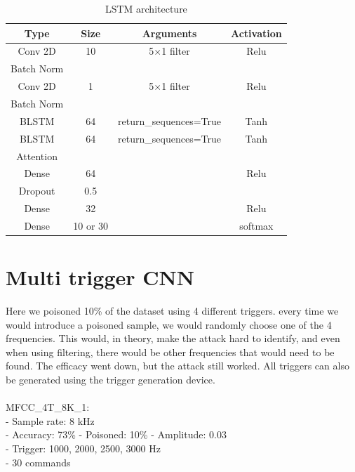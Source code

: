 \documentclass{report}
\theoremstyle{definition}
\theoremstyle{remark}
\begin{document}
\begin{table}[!ht]
    \centering
    \small
        \begin{tabular}{cccc}
            \hline
            Type & Size & Arguments & Activation \\ \hline
            Conv 2D & 10 & 5$\times$1 filter & Relu \\ 
            Batch Norm &  &  &  \\ 
            Conv 2D & 1 & 5$\times$1 filter & Relu \\ 
            Batch Norm &  &  &  \\ 
            BLSTM & 64 & return\_sequences=True & Tanh \\ 
            BLSTM & 64 & return\_sequences=True & Tanh \\ 
            Attention & & & \\ 
            Dense & 64 &  & Relu \\
            Dropout & 0.5 &  &  \\ 
            Dense & 32 &  & Relu \\ 
            Dense & 10 or 30 &  & softmax \\ \hline
        \end{tabular}
        \caption{LSTM architecture}
    \label{tab:nn-lstm}
\end{table}

\section{Multi trigger CNN}
Here we poisoned 10\%  of the dataset using 4 different triggers. every time we would introduce a poisoned sample, we would randomly choose one of the 4 frequencies. This would, in theory, make the attack hard to identify, and even when using filtering, there would be other frequencies that would need to be found. The efficacy went down, but the attack still worked. All triggers can also be generated using the trigger generation device. 
\\\\
MFCC\_4T\_8K\_1:\\
- Sample rate: 8 kHz\\
- Accuracy: 73\%
- Poisoned: 10\%
- Amplitude: 0.03\\
- Trigger: 1000, 2000, 2500, 3000 Hz\\
- 30 commands\\
\end{document}
